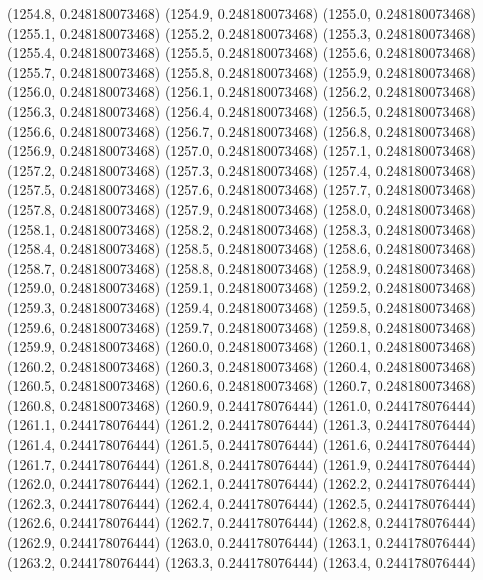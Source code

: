 {					(1254.8, 0.248180073468)
					(1254.9, 0.248180073468)
					(1255.0, 0.248180073468)
					(1255.1, 0.248180073468)
					(1255.2, 0.248180073468)
					(1255.3, 0.248180073468)
					(1255.4, 0.248180073468)
					(1255.5, 0.248180073468)
					(1255.6, 0.248180073468)
					(1255.7, 0.248180073468)
					(1255.8, 0.248180073468)
					(1255.9, 0.248180073468)
					(1256.0, 0.248180073468)
					(1256.1, 0.248180073468)
					(1256.2, 0.248180073468)
					(1256.3, 0.248180073468)
					(1256.4, 0.248180073468)
					(1256.5, 0.248180073468)
					(1256.6, 0.248180073468)
					(1256.7, 0.248180073468)
					(1256.8, 0.248180073468)
					(1256.9, 0.248180073468)
					(1257.0, 0.248180073468)
					(1257.1, 0.248180073468)
					(1257.2, 0.248180073468)
					(1257.3, 0.248180073468)
					(1257.4, 0.248180073468)
					(1257.5, 0.248180073468)
					(1257.6, 0.248180073468)
					(1257.7, 0.248180073468)
					(1257.8, 0.248180073468)
					(1257.9, 0.248180073468)
					(1258.0, 0.248180073468)
					(1258.1, 0.248180073468)
					(1258.2, 0.248180073468)
					(1258.3, 0.248180073468)
					(1258.4, 0.248180073468)
					(1258.5, 0.248180073468)
					(1258.6, 0.248180073468)
					(1258.7, 0.248180073468)
					(1258.8, 0.248180073468)
					(1258.9, 0.248180073468)
					(1259.0, 0.248180073468)
					(1259.1, 0.248180073468)
					(1259.2, 0.248180073468)
					(1259.3, 0.248180073468)
					(1259.4, 0.248180073468)
					(1259.5, 0.248180073468)
					(1259.6, 0.248180073468)
					(1259.7, 0.248180073468)
					(1259.8, 0.248180073468)
					(1259.9, 0.248180073468)
					(1260.0, 0.248180073468)
					(1260.1, 0.248180073468)
					(1260.2, 0.248180073468)
					(1260.3, 0.248180073468)
					(1260.4, 0.248180073468)
					(1260.5, 0.248180073468)
					(1260.6, 0.248180073468)
					(1260.7, 0.248180073468)
					(1260.8, 0.248180073468)
					(1260.9, 0.244178076444)
					(1261.0, 0.244178076444)
					(1261.1, 0.244178076444)
					(1261.2, 0.244178076444)
					(1261.3, 0.244178076444)
					(1261.4, 0.244178076444)
					(1261.5, 0.244178076444)
					(1261.6, 0.244178076444)
					(1261.7, 0.244178076444)
					(1261.8, 0.244178076444)
					(1261.9, 0.244178076444)
					(1262.0, 0.244178076444)
					(1262.1, 0.244178076444)
					(1262.2, 0.244178076444)
					(1262.3, 0.244178076444)
					(1262.4, 0.244178076444)
					(1262.5, 0.244178076444)
					(1262.6, 0.244178076444)
					(1262.7, 0.244178076444)
					(1262.8, 0.244178076444)
					(1262.9, 0.244178076444)
					(1263.0, 0.244178076444)
					(1263.1, 0.244178076444)
					(1263.2, 0.244178076444)
					(1263.3, 0.244178076444)
					(1263.4, 0.244178076444)
}
